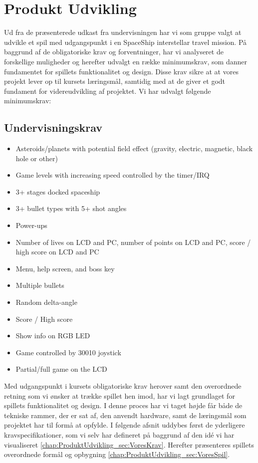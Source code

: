 \chapter{Produkt Udvikling} \label{chap:ProduktUdvikling}

Ud fra de præsenterede udkast fra undervisningen har vi som gruppe valgt at udvikle et spil med udgangspunkt i en SpaceShip interstellar travel mission. 
På baggrund af de obligatoriske krav og forventninger, har vi analyseret de forskellige muligheder og herefter udvalgt en række minimumskrav, som danner fundamentet for spillets funktionalitet og design. Disse krav sikre at at vores projekt lever op til kursets læringsmål, samtidig med at de giver et godt fundament for videreudvikling af projektet. 
Vi har udvalgt følgende minimumskrav:

\section{Undervisningskrav} \label{chap:ProduktUdvikling_sec:MandatoryRequirement}
\vspace{0.5em}

\begin{itemize}
    \setlength{\itemsep}{5pt}
    \setlength{\parskip}{0pt}
    \setlength{\parsep}{0pt}
    \item Asteroids/planets with potential field effect (gravity, electric, magnetic, black hole or other)
    \item Game levels with increasing speed controlled by the timer/IRQ
    \item 3+ stages docked spaceship
    \item 3+ bullet types with 5+ shot angles
    \item Power-ups
    \item Number of lives on LCD and PC, number of points on LCD and PC, score / high score on LCD and PC
    \item Menu, help screen, and boss key
    \item Multiple bullets
    \item Random delta-angle
    \item Score / High score
    \item Show info on RGB LED
    \item Game controlled by 30010 joystick
    \item Partial/full game on the LCD
\end{itemize}

Med udgangspunkt i kursets obligatoriske krav herover samt den overordnede retning som vi ønsker at trække spillet hen imod, har vi lagt grundlaget for spillets funktionalitet og design. I denne proces har vi taget højde får både de tekniske rammer, der er sat af, den anvendt hardware, samt de læringsmål som projektet har til formå at opfylde.
I følgende afsnit uddybes først de yderligere kravspecifikationer, som vi selv har defineret på baggrund af den idé vi har visualiseret \ref{chap:ProduktUdvikling_sec:VoresKrav}.
Herefter præsenteres spillets overordnede formål og opbygning \ref{chap:ProduktUdvikling_sec:VoresSpil}. 

